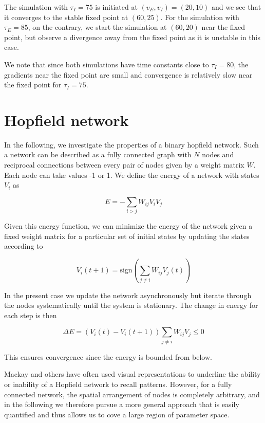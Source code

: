 \documentclass{article}
\begin{document}
The simulation with $\tau_I = 75$ is initiated at $(v_E, v_I) = (20, 10)$ and we see that it converges to the stable fixed point at $(60, 25)$. For the simulation with $\tau_E = 85$, on the contrary, we start the simulation at $(60, 20)$ near the fixed point, but observe a divergence away from the fixed point as it is unstable in this case.

We note that since both simulations have time constants close to $\tau_I = 80$, the gradients near the fixed point are small and convergence is relatively slow near the fixed point for $\tau_I = 75$.

\section{Hopfield network}

In the following, we investigate the properties of a binary hopfield network. Such a network can be described as a fully connected graph with $N$ nodes and reciprocal connections between every pair of nodes given by a weight matrix $W$. Each node can take values -1 or 1. We define the energy of a network with states $V_i$ as

\begin{equation}
E = - \sum_{i>j}{W_{ij}V_i V_j}
\end{equation}

Given this energy function, we can minimize the energy of the network given a fixed weight matrix for a particular set of initial states by updating the states according to

\begin{equation}
V_i(t+1) = \text{sign}(\sum_{j \neq i}{W_{ij}V_j(t)})
\end{equation}

In the present case we update the network asynchronously but iterate through the nodes systematically until the system is stationary. The change in energy for each step is then

\begin{equation}
\Delta E = (V_i(t) - V_i(t+1)) \sum_{j \neq i}{W_{ij}V_j} \leq 0
\end{equation}

This ensures convergence since the energy is bounded from below.


Mackay and others have often used visual representations to underline the ability or inability of a Hopfield network to recall patterns. However, for a fully connected network, the spatial arrangement of nodes is completely arbitrary, and in the following we therefore pursue a more general approach that is easily quantified and thus allows us to cove a large region of parameter space.
\end{document}
